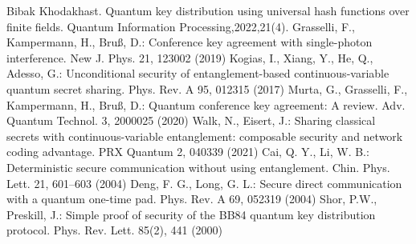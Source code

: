 \documentclass[pdflatex,sn-mathphys]{sn-jnl}%
\theoremstyle{thmstyleone}%
\theoremstyle{thmstyletwo}%
\theoremstyle{thmstylethree}%
\begin{document}
\begin{appendices}
\begin{thebibliography}{999}
	Bibak Khodakhast. Quantum key distribution using universal hash functions over finite fields. Quantum Information Processing,2022,21(4).
	Grasselli, F., Kampermann, H., Bruß, D.: Conference key agreement with single-photon interference. New J. Phys. 21, 123002 (2019)
	Kogias, I., Xiang, Y., He, Q., Adesso, G.: Unconditional security of entanglement-based continuous-variable quantum secret sharing. Phys. Rev. A 95, 012315 (2017)
	Murta, G., Grasselli, F., Kampermann, H., Bruß, D.: Quantum conference key agreement: A review. Adv. Quantum Technol. 3, 2000025 (2020)
	Walk, N., Eisert, J.: Sharing classical secrets with continuous-variable entanglement: composable security and network coding advantage. PRX Quantum 2, 040339 (2021)
	Cai, Q. Y., Li, W. B.: Deterministic secure communication without using entanglement. Chin. Phys. Lett. 21, 601–603 (2004)
	Deng, F. G., Long, G. L.: Secure direct communication with a quantum one-time pad. Phys. Rev. A 69, 052319 (2004)
	Shor, P.W., Preskill, J.: Simple proof of security of the BB84 quantum key distribution protocol. Phys. Rev. Lett. 85(2), 441 (2000)
 
 \end{thebibliography}




\end{appendices}



\end{document}
